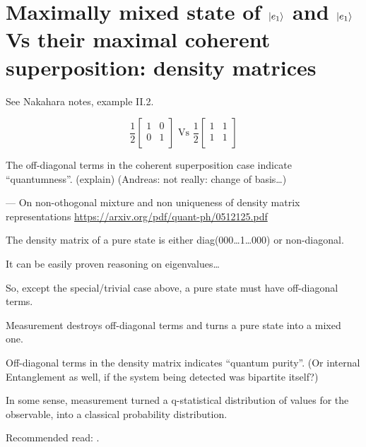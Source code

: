 \section{Maximally mixed state of $\ket{e_1}$ and $\ket{e_1}$
Vs their maximal coherent superposition: density matrices}

See Nakahara notes, example II.2.

$$
\frac{1}{2}\begin{bmatrix}
  1 &0  \\
  0 &1  \\
\end{bmatrix}
\text{ Vs }
\frac{1}{2}\begin{bmatrix}
  1 &1  \\
  1 &1  \\
\end{bmatrix}
$$

The off-diagonal terms in the coherent superposition case indicate
``quantumness''. (explain) (Andreas: not really: change of basis\dots)

--- On non-othogonal mixture and non uniqueness of density matrix representations
\url{https://arxiv.org/pdf/quant-ph/0512125.pdf}

\begin{remark}
  The density matrix of a pure state is either diag(000\dots1\dots000) or non-diagonal.

  It can be easily proven reasoning on eigenvalues\dots

  So, except the special/trivial case above, a pure state must have off-diagonal terms.
\end{remark}

Measurement destroys off-diagonal terms and turns a pure state into a mixed one.

Off-diagonal terms in the density matrix indicates ``quantum purity''.
(Or internal Entanglement as well, if the system being detected was bipartite itself?)

In some sense, measurement turned a q-statistical distribution of values for the observable,
into a classical probability distribution.

Recommended read: \cite{Zurek_Decoherence, Zurek_Decoherence2}.
